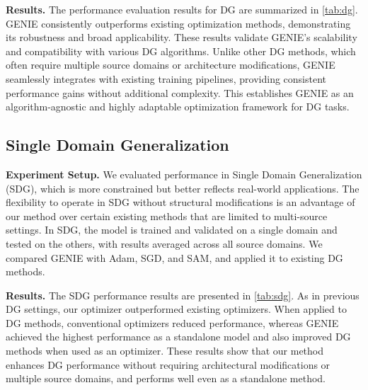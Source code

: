 \documentclass{article}
\theoremstyle{plain}
\theoremstyle{definition}
\theoremstyle{remark}
\begin{document}
\textbf{Results.} The performance evaluation results for DG are summarized in \cref{tab:dg}. GENIE consistently outperforms existing optimization methods, demonstrating its robustness and broad applicability. These results validate GENIE's scalability and compatibility with various DG algorithms. Unlike other DG methods, which often require multiple source domains or architecture modifications, GENIE seamlessly integrates with existing training pipelines, providing consistent performance gains without additional complexity. This establishes GENIE as an algorithm-agnostic and highly adaptable optimization framework for DG tasks.
\subsection{Single Domain Generalization}
\label{Sec-4: Single Domain generalization}
\textbf{Experiment Setup.} We evaluated performance in Single Domain Generalization (SDG), which is more constrained but better reflects real-world applications. The flexibility to operate in SDG without structural modifications is an advantage of our method over certain existing methods that are limited to multi-source settings. In SDG, the model is trained and validated on a single domain and tested on the others, with results averaged across all source domains. We compared GENIE with Adam, SGD, and SAM, and applied it to existing DG methods. 

\textbf{Results.} The SDG performance results are presented in \cref{tab:sdg}. As in previous DG settings, our optimizer outperformed existing optimizers. When applied to DG methods, conventional optimizers reduced performance, whereas GENIE achieved the highest performance as a standalone model and also improved DG methods when used as an optimizer. These results show that our method enhances DG performance without requiring architectural modifications or multiple source domains, and performs well even as a standalone method.
\end{document}
